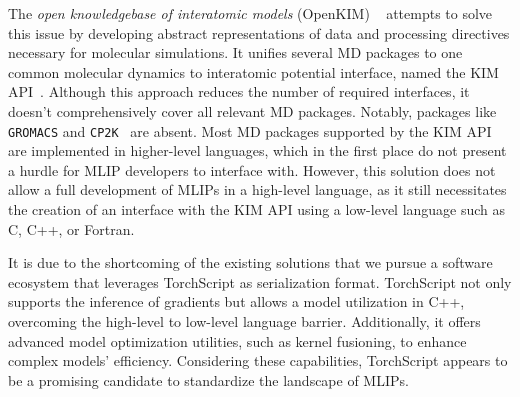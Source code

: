 The \emph{open knowledgebase of interatomic models} (OpenKIM) ~\cite{karls2020openkim} attempts to solve this issue by developing abstract representations of data and processing directives necessary for molecular simulations.
It unifies several MD packages to one common molecular dynamics to interatomic potential interface, named the KIM API~\cite{elliott2011kim}.
Although this approach reduces the number of required interfaces, it doesn't comprehensively cover all relevant MD packages.
Notably, packages like \texttt{GROMACS} and \texttt{CP2K}~\cite{kuhne2020cp2k} are absent.
Most MD packages supported by the KIM API are implemented in higher-level languages, which in the first place do not present a hurdle for MLIP developers to interface with.
However, this solution does not allow a full development of MLIPs in a high-level language, as it still necessitates the creation of an interface with the KIM API using a low-level language such as C, C++, or Fortran.

It is due to the shortcoming of the existing solutions that we pursue a software ecosystem that leverages TorchScript as serialization format.
TorchScript not only supports the inference of gradients but allows a model utilization in C++, overcoming the high-level to low-level language barrier.
Additionally, it offers advanced model optimization utilities, such as kernel fusioning, to enhance complex models' efficiency.
Considering these capabilities, TorchScript appears to be a promising candidate to standardize the landscape of MLIPs.

%




